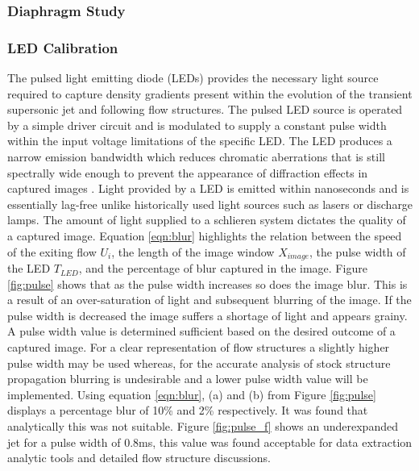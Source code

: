 \subsubsection{Diaphragm Study}

\subsubsection{LED Calibration}
The pulsed light emitting diode (LEDs) provides the necessary light source required to capture density gradients present within the evolution of the transient supersonic jet and following flow structures. The pulsed LED source is operated by a simple driver circuit and is modulated to supply a constant pulse width within the input voltage limitations of the specific LED. The LED produces a narrow emission bandwidth which reduces chromatic aberrations that is still spectrally wide enough to prevent the appearance of diffraction effects in captured images \citep{willert2012assessment}. Light provided by a LED is emitted within nanoseconds and is essentially lag-free unlike historically used light sources such as lasers or discharge lamps. The amount of light supplied to a schlieren system dictates the quality of a captured image. Equation \ref{eqn:blur} highlights the relation between the speed of the exiting flow $U_i$, the length of the image window $X_{image}$, the pulse width of the LED $T_{LED}$, and the percentage of blur captured in the image. Figure \ref{fig:pulse} shows that as the pulse width increases so does the image blur. This is a result of an over-saturation of light and subsequent blurring of the image. If the pulse width is decreased the image suffers a shortage of light and appears grainy. A pulse width value is determined sufficient based on the desired outcome of a captured image. For a clear representation of flow structures a slightly higher pulse width may be used whereas, for the accurate analysis of stock structure propagation blurring is undesirable and a lower pulse width value will be implemented. Using equation \ref{eqn:blur}, (a) and (b) from Figure \ref{fig:pulse} displays a percentage blur of 10\% and 2\% respectively. It was found that analytically this was not suitable. Figure \ref{fig:pulse_f} shows an underexpanded jet for a pulse width of 0.8ms, this value was found acceptable for data extraction analytic tools and detailed flow structure discussions.




